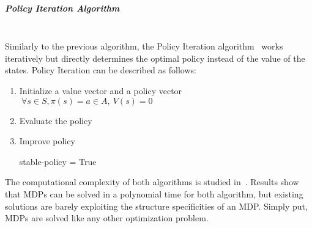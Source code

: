 \subparagraph{Policy Iteration Algorithm}\textbf{\\}
Similarly to the previous algorithm, the Policy Iteration algorithm~\cite{policyiteration} works iteratively but directly determines the optimal policy instead of the value of the states.
Policy Iteration can be described as follows:
\begin{enumerate}
    \item Initialize a value vector and a policy vector $~\forall s\in S,\pi(s)=a\in A,~V(s)=0$
    \item Evaluate the policy
        \begin{algorithm}
        \end{algorithm}\newpage
    \item Improve policy
    \begin{algorithm}
        stable-policy = True
    \end{algorithm}
\end{enumerate}



The computational complexity of both algorithms is studied in~\cite{mdpcomplexity}.
Results show that MDPs can be solved in a polynomial time for both algorithm, but existing solutions are barely exploiting the structure specificities of an MDP. Simply put, MDPs are solved like any other optimization problem.

